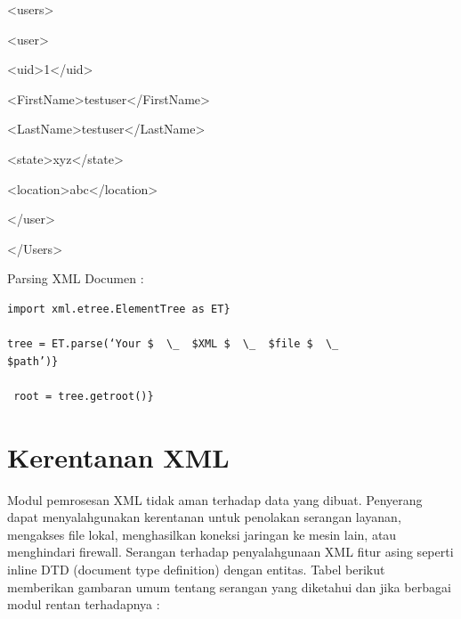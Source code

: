 {\fontsize{10pt}{10pt}\selectfont <users>} 
 
{\fontsize{10pt}{10pt}\selectfont  \hspace*{0.5in} <user>} 
 
{\fontsize{10pt}{10pt}\selectfont  \hspace*{0.5in}  \hspace*{0.5in} <uid>1</uid>} 
 
{\fontsize{10pt}{10pt}\selectfont  \hspace*{0.5in}  \hspace*{0.5in} <FirstName>testuser</FirstName>} 
 
{\fontsize{10pt}{10pt}\selectfont  \hspace*{0.5in}  \hspace*{0.5in} <LastName>testuser</LastName>} 
 
{\fontsize{10pt}{10pt}\selectfont  \hspace*{0.5in}  \hspace*{0.5in} <state>xyz</state>} 
 
{\fontsize{10pt}{10pt}\selectfont  \hspace*{0.5in}  \hspace*{0.5in} <location>abc</location>} 
 
{\fontsize{10pt}{10pt}\selectfont  \hspace*{0.5in} </user>} 
 
{\fontsize{10pt}{10pt}\selectfont </Users>} 
\vspace{10pt}
 
Parsing XML Documen : 
\begin{verbatim} 
import xml.etree.ElementTree as ET} 
 
tree = ET.parse(‘Your $  \_  $XML $  \_  $file $  \_  
$path’)} 
 
 root = tree.getroot()} 
\end{verbatim}

\section{Kerentanan XML}
\hspace*{0.5in} Modul pemrosesan XML tidak aman terhadap data yang dibuat. Penyerang dapat menyalahgunakan kerentanan untuk penolakan serangan layanan, mengakses file lokal, menghasilkan koneksi jaringan ke mesin lain, atau menghindari firewall. Serangan terhadap penyalahgunaan XML fitur asing seperti inline DTD (document type definition) dengan entitas. Tabel berikut memberikan gambaran umum tentang serangan yang diketahui dan jika berbagai modul rentan terhadapnya :


